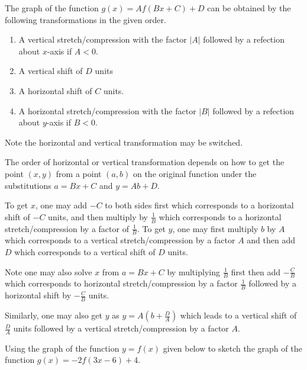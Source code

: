 \begin{howto}
  The graph of the function $g(x)=Af(Bx+C)+D$ can be obtained by the following transformations in the given order.
  \begin{enumerate}
    \item A vertical stretch/compression with the factor $|A|$ followed by a refection about $x$-axis if $A<0$.
    \item A vertical shift of $D$ units
    \item A horizontal shift of $C$ units.
    \item A horizontal stretch/compression with the factor $|B|$ followed by a refection about $y$-axis if $B<0$.
  \end{enumerate}
\end{howto}
\begin{remark}
  Note the horizontal and vertical transformation may be switched.

  The order of horizontal or vertical transformation depends on how to get the point $(x, y)$ from a point $(a, b)$ on the original function under the substitutions $a=Bx+C$ and $y=Ab+D$. 
  
  To get $x$, one may add $-C$ to both sides first which corresponds to a horizontal shift of $-C$ units, and then multiply by $\frac1B$ which corresponds to a horizontal stretch/compression by a factor of $\frac1B$. To get $y$, one may first multiply $b$ by $A$ which corresponds to a vertical stretch/compression by a factor $A$ and then add $D$ which corresponds to a vertical shift of $D$ units.

  Note one may also solve $x$ from $a=Bx+C$ by multiplying $\frac{1}{B}$ first then add $-\frac CB$ which corresponds to horizontal stretch/compression by a factor $\frac1B$ followed by a horizontal shift by $-\frac CB$ units.

  Similarly, one may also get $y$ as $y=A(b+\frac DA)$ which leads to a vertical shift of $\frac DA$ units followed by a vertical stretch/compression by a factor $A$. 


\end{remark}
\begin{example}
  Using the graph of the function $y=f(x)$ given below to sketch the graph of the function $g(x)=-2f(3x-6)+4$.\\

\end{example}

